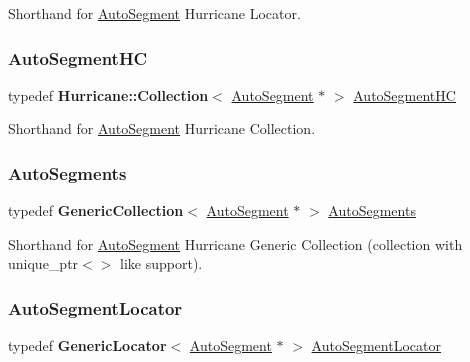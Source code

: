 Shorthand for \hyperlink{classKatabatic_1_1AutoSegment}{Auto\+Segment} Hurricane Locator. \mbox{\label{namespaceKatabatic_acb3628dc7705fefe38a665cfe43efa6e}} 
\subsubsection{\texorpdfstring{Auto\+Segment\+HC}{AutoSegmentHC}}
{\footnotesize\ttfamily typedef \textbf{ Hurricane\+::\+Collection}$<$ \hyperlink{classKatabatic_1_1AutoSegment}{Auto\+Segment} $\ast$ $>$ \hyperlink{namespaceKatabatic_acb3628dc7705fefe38a665cfe43efa6e}{Auto\+Segment\+HC}}

Shorthand for \hyperlink{classKatabatic_1_1AutoSegment}{Auto\+Segment} Hurricane Collection. \mbox{\label{namespaceKatabatic_a2221b0ddbc24f331809fc86f98e38041}} 
\subsubsection{\texorpdfstring{Auto\+Segments}{AutoSegments}}
{\footnotesize\ttfamily typedef \textbf{ Generic\+Collection}$<$ \hyperlink{classKatabatic_1_1AutoSegment}{Auto\+Segment} $\ast$ $>$ \hyperlink{namespaceKatabatic_a2221b0ddbc24f331809fc86f98e38041}{Auto\+Segments}}

Shorthand for \hyperlink{classKatabatic_1_1AutoSegment}{Auto\+Segment} Hurricane Generic Collection (collection with {\ttfamily unique\+\_\+ptr$<$$>$} like support). \mbox{\label{namespaceKatabatic_ace866cc8e09faf80f71a4087bb8e5870}} 
\subsubsection{\texorpdfstring{Auto\+Segment\+Locator}{AutoSegmentLocator}}
{\footnotesize\ttfamily typedef \textbf{ Generic\+Locator}$<$ \hyperlink{classKatabatic_1_1AutoSegment}{Auto\+Segment} $\ast$ $>$ \hyperlink{namespaceKatabatic_ace866cc8e09faf80f71a4087bb8e5870}{Auto\+Segment\+Locator}}

